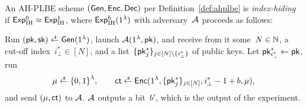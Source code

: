\begin{definition}\label{def:ahplbe-index-hiding}
An AH-PLBE scheme $(\Gen,\Enc,\Dec)$ per Definition~\ref{def:ahplbe}
is \emph{index-hiding} if ${\ExpIH{0}\approx\ExpIH{1}}$,
where $\ExpIH{b}(1^\lambda)$ with adversary~${\mathcal{A}}$ proceeds as follows:
\begin{security}
Run
${(\pk,\sk)\draws\Gen(1^\lambda)}$,
launch $\scriptA(1^\lambda,\pk)$, and
receive from it
some~${N\in{\mathbb{N}}}$,
a cut-off index~${i_\bot^\ast\in[N]}$, and
a list~$\{\pk^\ast_j\}_{j\in[N]\setminus\{i_\bot^\ast\}}$ of public keys.
Let ${\pk^\ast_{i_\bot^\ast}\gets\pk}$,
run
\begin{align*}
\mu\draws\bit^\lambda,\qquad
\ct\draws\Enc(1^\lambda,\{\pk^\ast_j\}_{j\in[N]},i_\bot^\ast-1+b,\mu),
\end{align*}
and send $(\mu,\ct)$ to ${\mathcal{A}}$.
${\mathcal{A}}$ outputs a bit~$b'$, which is the output of the experiment.
\end{security}
\end{definition}
